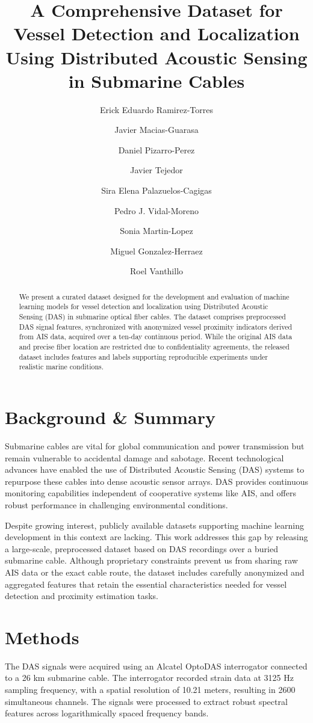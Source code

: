 \documentclass[11pt]{article}
\title{A Comprehensive Dataset for Vessel Detection and Localization Using Distributed Acoustic Sensing in Submarine Cables}
\author[1]{Erick Eduardo Ramirez-Torres}
\author[1]{Javier Macias-Guarasa}
\author[1]{Daniel Pizarro-Perez}
\author[2]{Javier Tejedor}
\author[1]{Sira Elena Palazuelos-Cagigas}
\author[1]{Pedro J. Vidal-Moreno}
\author[1]{Sonia Martin-Lopez}
\author[1]{Miguel Gonzalez-Herraez}
\author[3]{Roel Vanthillo}
\affil[1]{Departamento de Electr\'onica, Universidad de Alcal\'a, Alcal\'a de Henares, Spain}
\affil[2]{Universidad San Pablo-CEU, Boadilla del Monte, Spain}
\affil[3]{Marlinks, Leuven, Belgium}
\date{}
\begin{document}
\maketitle

\begin{abstract}
We present a curated dataset designed for the development and evaluation of machine learning models for vessel detection and localization using Distributed Acoustic Sensing (DAS) in submarine optical fiber cables. The dataset comprises preprocessed DAS signal features, synchronized with anonymized vessel proximity indicators derived from AIS data, acquired over a ten-day continuous period. While the original AIS data and precise fiber location are restricted due to confidentiality agreements, the released dataset includes features and labels supporting reproducible experiments under realistic marine conditions.
\end{abstract}

\section*{Background \& Summary}
Submarine cables are vital for global communication and power transmission but remain vulnerable to accidental damage and sabotage. Recent technological advances have enabled the use of Distributed Acoustic Sensing (DAS) systems to repurpose these cables into dense acoustic sensor arrays. DAS provides continuous monitoring capabilities independent of cooperative systems like AIS, and offers robust performance in challenging environmental conditions.

Despite growing interest, publicly available datasets supporting machine learning development in this context are lacking. This work addresses this gap by releasing a large-scale, preprocessed dataset based on DAS recordings over a buried submarine cable. Although proprietary constraints prevent us from sharing raw AIS data or the exact cable route, the dataset includes carefully anonymized and aggregated features that retain the essential characteristics needed for vessel detection and proximity estimation tasks.

\section*{Methods}
The DAS signals were acquired using an Alcatel OptoDAS interrogator connected to a 26 km submarine cable. The interrogator recorded strain data at 3125 Hz sampling frequency, with a spatial resolution of 10.21 meters, resulting in 2600 simultaneous channels. The signals were processed to extract robust spectral features across logarithmically spaced frequency bands.
\end{document}
